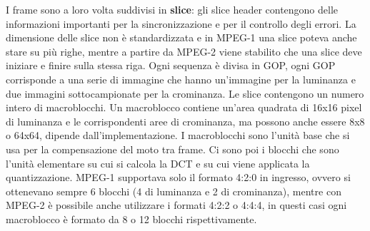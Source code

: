I frame sono a loro volta suddivisi in \textbf{slice}: gli slice header contengono delle informazioni importanti per la sincronizzazione e per il controllo degli errori. La dimensione delle slice non è standardizzata e in MPEG-1 una slice poteva anche stare su più righe, mentre a partire da MPEG-2 viene stabilito che una slice deve iniziare e finire sulla stessa riga.
Ogni sequenza è divisa in GOP, ogni GOP corrisponde a una serie di immagine che hanno un'immagine per la luminanza e due immagini sottocampionate per la crominanza. 
Le slice contengono un numero intero di macroblocchi. Un macroblocco contiene un'area quadrata di 16x16 pixel di luminanza e le corrispondenti aree di crominanza, ma possono anche essere 8x8 o 64x64, dipende dall'implementazione. I macroblocchi sono l'unità base che si usa per la compensazione del moto tra frame. Ci sono poi i blocchi che sono l'unità elementare su cui si calcola la DCT e su cui viene applicata la quantizzazione. MPEG-1 supportava solo il formato 4:2:0 in ingresso, ovvero si ottenevano sempre 6 blocchi (4 di luminanza e 2 di crominanza), mentre con MPEG-2 è possibile anche utilizzare i formati 4:2:2 o 4:4:4, in questi casi ogni macroblocco è formato da 8 o 12 blocchi rispettivamente.


\begin{figure}[htbp!]
    \centering
    
\end{figure}
\FloatBarrier


\let\cleardoublepage\clearpage